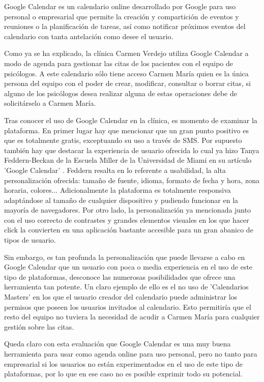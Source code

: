 Google Calendar es un calendario online desarrollado por Google para uso personal o empresarial que permite la creación y compartición de eventos y reuniones o la planificación de tareas, así como notificar próximos eventos del calendario con tanta antelación como desee el usuario. \bigskip

Como ya se ha explicado, la clínica Carmen Verdejo utiliza Google Calendar a modo de agenda para gestionar las citas de los pacientes con el equipo de psicólogos. A este calendario sólo tiene acceso Carmen María quien es la única persona del equipo con el poder de crear, modificar, consultar o borrar citas, si alguno de los psicólogos desea realizar alguna de estas operaciones debe de solicitárselo a Carmen María. \bigskip

Tras conocer el uso de Google Calendar en la clínica, es momento de examinar la plataforma. En primer lugar hay que mencionar que un gran punto positivo es que es totalmente gratis, exceptuando su uso a través de SMS. Por supuesto también hay que destacar la experiencia de usuario ofrecida lo cual ya hizo Tanya Feddern-Beckan de la Escuela Miller de la Universidad de Miami en su artículo 'Google Calendar' \cite{FeddernBekcan2008}. Feddern resalta en lo referente a usabilidad, la alta personalización ofrecida: tamaño de fuente, idioma, formato de fecha y hora, zona horaria, colores... Adicionalmente la plataforma es totalmente responsiva adaptándose al tamaño de cualquier dispositivo y pudiendo funcionar en la mayoría de navegadores. Por otro lado, la personalización ya mencionada junto con el uso correcto de contrastes y grandes elementos visuales en los que hacer click la convierten en una aplicación bastante accesible para un gran abanico de tipos de usuario. \bigskip

Sin embargo, es tan profunda la personalización que puede llevarse a cabo en Google Calendar que un usuario con poca o media experiencia en el uso de este tipo de plataformas, desconoce las numerosas posibilidades que ofrece una herramienta tan potente. Un claro ejemplo de ello es el no uso de 'Calendarios Masters' en los que el usuario creador del calendario puede administrar los permisos que poseen los usuarios invitados al calendario. Esto permitiría que el resto del equipo no tuviera la necesidad de acudir a Carmen María para cualquier gestión sobre las citas. \bigskip

Queda claro con esta evaluación que Google Calendar es una muy buena herramienta para usar como agenda online para uso personal, pero no tanto para empresarial si los usuarios no están experimentados en el uso de este tipo de plataformas, por lo que en ese caso no es posible exprimir todo su potencial.

